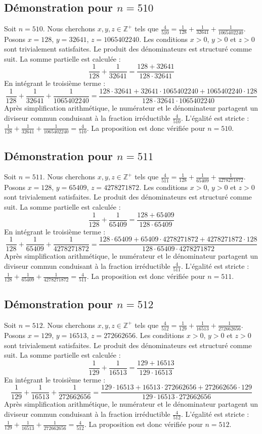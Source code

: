 \documentclass[11pt,a4paper]{article}
\begin{document}
\subsection{Démonstration pour $n = 510$}
Soit $n = 510$. Nous cherchons $x, y, z \in \mathbb{Z}^{+}$ tels que $\frac{4}{510} = \frac{1}{128} + \frac{1}{32641} + \frac{1}{1065402240}$.
Posons $x = 128$, $y = 32641$, $z = 1065402240$.
Les conditions $x > 0$, $y > 0$ et $z > 0$ sont trivialement satisfaites.
Le produit des dénominateurs est structuré comme suit. La somme partielle est calculée :
$$ \frac{1}{128} + \frac{1}{32641} = \frac{128+32641}{128 \cdot 32641} $$
En intégrant le troisième terme :
$$ \frac{1}{128} + \frac{1}{32641} + \frac{1}{1065402240} = \frac{128 \cdot 32641 + 32641 \cdot 1065402240 + 1065402240 \cdot 128}{128 \cdot 32641 \cdot 1065402240} $$
Après simplification arithmétique, le numérateur et le dénominateur partagent un diviseur commun conduisant à la fraction irréductible $\frac{4}{510}$.
L'égalité est stricte : $\frac{1}{128} + \frac{1}{32641} + \frac{1}{1065402240} = \frac{4}{510}$.
La proposition est donc vérifiée pour $n = 510$.
\subsection{Démonstration pour $n = 511$}
Soit $n = 511$. Nous cherchons $x, y, z \in \mathbb{Z}^{+}$ tels que $\frac{4}{511} = \frac{1}{128} + \frac{1}{65409} + \frac{1}{4278271872}$.
Posons $x = 128$, $y = 65409$, $z = 4278271872$.
Les conditions $x > 0$, $y > 0$ et $z > 0$ sont trivialement satisfaites.
Le produit des dénominateurs est structuré comme suit. La somme partielle est calculée :
$$ \frac{1}{128} + \frac{1}{65409} = \frac{128+65409}{128 \cdot 65409} $$
En intégrant le troisième terme :
$$ \frac{1}{128} + \frac{1}{65409} + \frac{1}{4278271872} = \frac{128 \cdot 65409 + 65409 \cdot 4278271872 + 4278271872 \cdot 128}{128 \cdot 65409 \cdot 4278271872} $$
Après simplification arithmétique, le numérateur et le dénominateur partagent un diviseur commun conduisant à la fraction irréductible $\frac{4}{511}$.
L'égalité est stricte : $\frac{1}{128} + \frac{1}{65409} + \frac{1}{4278271872} = \frac{4}{511}$.
La proposition est donc vérifiée pour $n = 511$.
\subsection{Démonstration pour $n = 512$}
Soit $n = 512$. Nous cherchons $x, y, z \in \mathbb{Z}^{+}$ tels que $\frac{4}{512} = \frac{1}{129} + \frac{1}{16513} + \frac{1}{272662656}$.
Posons $x = 129$, $y = 16513$, $z = 272662656$.
Les conditions $x > 0$, $y > 0$ et $z > 0$ sont trivialement satisfaites.
Le produit des dénominateurs est structuré comme suit. La somme partielle est calculée :
$$ \frac{1}{129} + \frac{1}{16513} = \frac{129+16513}{129 \cdot 16513} $$
En intégrant le troisième terme :
$$ \frac{1}{129} + \frac{1}{16513} + \frac{1}{272662656} = \frac{129 \cdot 16513 + 16513 \cdot 272662656 + 272662656 \cdot 129}{129 \cdot 16513 \cdot 272662656} $$
Après simplification arithmétique, le numérateur et le dénominateur partagent un diviseur commun conduisant à la fraction irréductible $\frac{4}{512}$.
L'égalité est stricte : $\frac{1}{129} + \frac{1}{16513} + \frac{1}{272662656} = \frac{4}{512}$.
La proposition est donc vérifiée pour $n = 512$.
\end{document}

